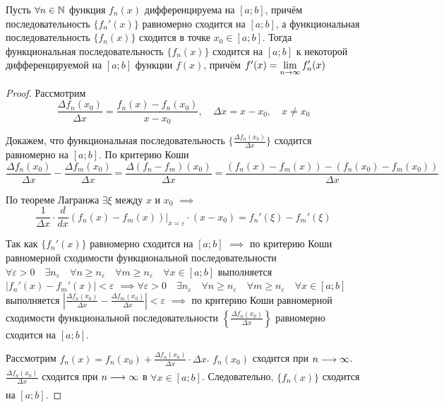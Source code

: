 \begin{theorem}
    Пусть $\forall n \in \mathbb{N}$ функция $f_n(x)$ дифференцируема на $[a; b]$,
    причём последовательность $\{ f_n'(x) \}$ равномерно сходится на $[a; b]$,
    а функциональная последовательность $\{ f_n(x) \}$ сходится в точке
    $x_0 \in [a; b]$. Тогда функциональная последовательность $\{ f_n(x) \}$
    сходится на $[a; b]$ к некоторой дифференцируемой на $[a; b]$ 
    функции $f(x)$, причём $f'(x) = \displaystyle\lim_{n \to \infty} f_n' (x)$
\end{theorem}
\begin{proof}
    Рассмотрим
    \[
        \frac{\Delta f_n(x_0)}{\Delta x}
        = \frac{f_n(x) - f_n(x_0)}{x - x_0}, 
        \quad \Delta x = x - x_0, \quad x \ne x_0
    \]

    Докажем, что функциональная последовательность 
    $\{ \frac{\Delta f_n(x_0)}{\Delta x} \}$ сходится равномерно на $[a; b]$.
    По критерию Коши
    \[
        \frac{\Delta f_n(x_0)}{\Delta x} - \frac{\Delta f_m(x_0)}{\Delta x}
        = \frac{\Delta (f_n - f_m)(x_0)}{\Delta x}
        = \frac{(f_n(x) - f_m(x)) - (f_n(x_0) - f_m(x_0))}{\Delta x}
    \]

    По теореме Лагранжа $\exists \xi$ между $x$ и $x_0$ $\implies$
    \[
        \frac{1}{\Delta x} \cdot 
        \frac{d}{dx} (f_n (x) - f_m(x)) \Big|_{x=\varepsilon} \cdot (x - x_0)
        = f_n'(\xi) - f_m'(\xi)
    \]

    Так как $\{ f_n'(x) \}$ равномерно сходится на $[a; b]$ $\implies$
    по критерию Коши равномерной сходимости функциональной последовательности
    $\forall \varepsilon > 0 \quad \exists n_\varepsilon \quad
    \forall n \geq n_\varepsilon \quad \forall m \geq n_\varepsilon \quad
    \forall x \in [a; b]$ выполняется $|f_n'(x) - f_m'(x)| < \varepsilon$
    $\implies \forall \varepsilon > 0 \quad \exists n_\varepsilon \quad
    \forall n \geq n_\varepsilon \quad \forall m \geq n_\varepsilon \quad
    \forall x \in [a; b]$ выполняется
    $\left| \frac{\Delta f_n(x_0)}{\Delta x} - \frac{\Delta f_m(x_0)}{\Delta x} \right| < \varepsilon$
    $\implies$ по критерию Коши равномерной сходимости функциональной
    последовательности $\left\{ \frac{\Delta f_n(x_0)}{\Delta x} \right\}$
    равномерно сходится на $[a; b]$.

    Рассмотрим $f_n(x) = f_n(x_0) + \frac{\Delta f_n(x_0)}{\Delta x} \cdot \Delta x$.
    $f_n(x_0)$ сходится при $n \underset{}{\longrightarrow} \infty$. 
    $\frac{\Delta f_n(x_0)}{\Delta x}$ сходится при $n \underset{}{\longrightarrow} \infty$ в
    $\forall x \in [a; b]$.
    Следовательно, $\{ f_n(x) \}$ сходится на $[a; b]$.


\end{proof}
